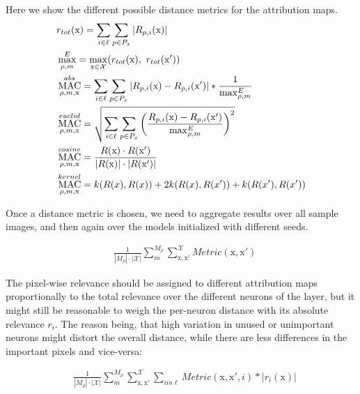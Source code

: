 Here we show the different possible distance metrics for the attribution maps.
\begin{align}
\displaystyle 
& r_{tot}(\mathrm{x}) = \sum_{i \in \ell} \sum_{p \in P_x} 
|R_{p,i}(\mathrm{x})| \notag \\
& \max_{\rho, m}^E = \max_{\mathrm{x} \in \mathcal{X}} (r_{tot}(\mathrm{x}) , \  r_{tot}(\mathrm{x}') ) \notag \\
& \operatorname*{MAC}_{\rho, m, \mathrm{x}}^{abs} = 
\sum_{i \in \ell} \sum_{p \in P_x} |R_{p,i}(\mathrm{x}) -R_{p,i}(\mathrm{x}')|* \frac{1}{\max_{\rho, m}^E} \\
& \operatorname*{MAC}_{\rho, m, \mathrm{x}}^{euclid} = \sqrt{ \sum_{i \in \ell} 
\sum_{p \in P_x}\left(\frac{R_{p,i}(\mathrm{x}) -R_{p,i}(\mathrm{x}')}{\max_{\rho, m}^E}\right)^2
} \\
& \operatorname*{MAC}_{\rho, m,\mathrm{x}}^{cosine} =
\frac{R(\mathrm{x}) \cdot R(\mathrm{x}') }{|R(\mathrm{x})|\cdot |R(\mathrm{x}')|} \\
& \operatorname*{MAC}_{\rho, m, \mathrm{x}}^{kernel} = k(R(x) ,R(x) ) + 2 k(R(x) ,R(x') ) + k(R(x') ,R(x') )  
\end{align}

Once a distance metric is chosen, we need to aggregate results over all sample images, and then again over the models initialized with different seeds.

\begin{align}
& \frac{1}{|M_\rho|\cdot |\mathcal{X}| }\sum_{m}^{M_{\rho}} \sum_{\mathrm{x,x'}}^{\mathcal{X}} Metric(\mathrm{x,x'})
\end{align}

The pixel-wise relevance should be assigned to different attribution maps proportionally to the total relevance over the different neurons of the layer, but it might still be reasonable to weigh the per-neuron distance with its absolute relevance $r_i$. The reason being, that high variation in unused or unimportant neurons might distort the overall distance, while there are less differences in the important pixels and vice-versa:

\begin{align}
& \frac{1}{|M_\rho|\cdot |\mathcal{X}| }\sum_{m}^{M_{\rho}} \sum_{\mathrm{x,x'}}^{\mathcal{X}} \sum_{i in \ell} 
Metric(\mathrm{x,x'}, i) * |r_i(\mathrm{x})|
\end{align}

